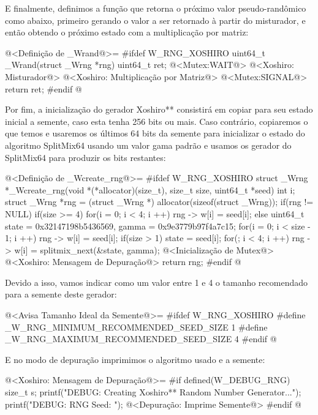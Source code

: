 E finalmente, definimos a função que retorna o próximo valor
pseudo-randômico como abaixo, primeiro gerando o valor a ser
retornado  à partir do misturador, e então obtendo o
próximo estado com a multiplicação por matriz:

\iniciocodigo
@<Definição de \_Wrand@>=
#ifdef W_RNG_XOSHIRO
uint64_t _Wrand(struct _Wrng *rng){
  uint64_t ret;
  @<Mutex:WAIT@>
  @<Xoshiro: Misturador@>
  @<Xoshiro: Multiplicação por Matriz@>
  @<Mutex:SIGNAL@>
  return ret;
}
#endif
@
\fimcodigo


Por fim, a inicialização do gerador Xoshiro** consistirá em copiar
para seu estado inicial a semente, caso esta tenha 256 bits ou
mais. Caso contrário, copiaremos o que temos e usaremos os últimos 64
bits da semente para inicializar o estado do algoritmo SplitMix64
usando um valor gama padrão e usamos os gerador do SplitMix64 para
produzir os bits restantes:

\iniciocodigo
@<Definição de \_Wcreate\_rng@>=
#ifdef W_RNG_XOSHIRO
struct _Wrng *_Wcreate_rng(void *(*allocator)(size_t), size_t size,
                           uint64_t *seed){
  int i;
  struct _Wrng *rng = (struct _Wrng *) allocator(sizeof(struct _Wrng));
  if(rng != NULL){
    if(size >= 4){
      for(i = 0; i < 4; i ++)
        rng -> w[i] = seed[i];
    }
    else{
      uint64_t state = 0x32147198b5436569, gamma = 0x9e3779b97f4a7c15;
      for(i = 0; i < size - 1; i ++)
        rng -> w[i] = seed[i];
      if(size > 1)
        state = seed[i];
      for(; i < 4; i ++)
        rng -> w[i] = splitmix_next(&state, gamma);
    }
    @<Inicialização de Mutex@>
    @<Xoshiro: Mensagem de Depuração@>
  }
  return rng;
}
#endif
@
\fimcodigo

Devido a isso, vamos indicar como um valor entre 1 e 4 o tamanho
recomendado para a semente deste gerador:

\iniciocodigo
@<Avisa Tamanho Ideal da Semente@>=
#ifdef W_RNG_XOSHIRO
#define _W_RNG_MINIMUM_RECOMMENDED_SEED_SIZE  1
#define _W_RNG_MAXIMUM_RECOMMENDED_SEED_SIZE  4
#endif
@
\fimcodigo

E no modo de depuração imprimimos o algoritmo usado e a semente:

\iniciocodigo
@<Xoshiro: Mensagem de Depuração@>=
#if defined(W_DEBUG_RNG)
{
  size_t s;
  printf("DEBUG: Creating Xoshiro** Random Number Generator...");
  printf("DEBUG: RNG Seed: ");
  @<Depuração: Imprime Semente@>
}
#endif
@
\fimcodigo


